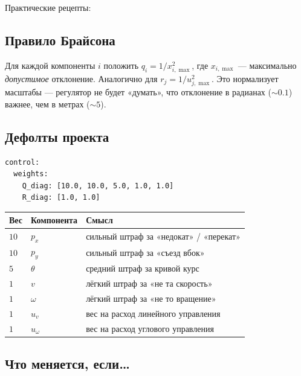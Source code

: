 Практические рецепты:

\subsection{Правило Брайсона}

Для каждой компоненты $i$ положить $q_i = 1/x_{i,\max}^2$, где
$x_{i,\max}$ --- максимально \emph{допустимое} отклонение. Аналогично
для $r_j = 1/u_{j,\max}^2$. Это нормализует масштабы --- регулятор не
будет «думать», что отклонение в радианах ($\sim 0.1$) важнее, чем в
метрах ($\sim 5$).

\subsection{Дефолты проекта}

\begin{codebox}[title={\filepath{config.yaml}, секция \texttt{control.weights}}]
\begin{verbatim}
control:
  weights:
    Q_diag: [10.0, 10.0, 5.0, 1.0, 1.0]
    R_diag: [1.0, 1.0]
\end{verbatim}
\end{codebox}

\begin{tabular}{lll}
\toprule
Вес & Компонента & Смысл\\
\midrule
$10$ & $p_x$       & сильный штраф за «недокат» / «перекат»\\
$10$ & $p_y$       & сильный штраф за «съезд вбок»\\
$5$  & $\theta$    & средний штраф за кривой курс\\
$1$  & $v$         & лёгкий штраф за «не та скорость»\\
$1$  & $\omega$    & лёгкий штраф за «не то вращение»\\
$1$  & $u_v$       & вес на расход линейного управления\\
$1$  & $u_\omega$  & вес на расход углового управления\\
\bottomrule
\end{tabular}

\subsection{Что меняется, если\dots}

